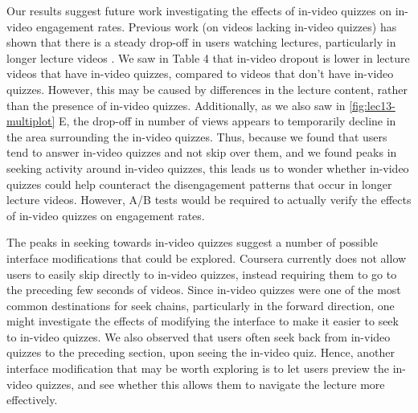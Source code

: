 \documentclass{sigchi}
\begin{document}
Our results suggest future work investigating the effects of in-video quizzes on in-video engagement rates. Previous work (on videos lacking in-video quizzes) has shown that there is a steady drop-off in users watching lectures, particularly in longer lecture videos \cite{juho}. We saw in Table 4 that in-video dropout is lower in lecture videos that have in-video quizzes, compared to videos that don't have in-video quizzes. However, this may be caused by differences in the lecture content, rather than the presence of in-video quizzes. Additionally, as we also saw in \autoref{fig:lec13-multiplot} E, the drop-off in number of views appears to temporarily decline in the area surrounding the in-video quizzes. Thus, because we found that users tend to answer in-video quizzes and not skip over them, and we found peaks in seeking activity around in-video quizzes, this leads us to wonder whether in-video quizzes could help counteract the disengagement patterns that occur in longer lecture videos. However, A/B tests would be required to actually verify the effects of in-video quizzes on engagement rates.



The peaks in seeking towards in-video quizzes suggest a number of possible interface modifications that could be explored. Coursera currently does not allow users to easily skip directly to in-video quizzes, instead requiring them to go to the preceding few seconds of videos. Since in-video quizzes were one of the most common destinations for seek chains, particularly in the forward direction, one might investigate the effects of modifying the interface to make it easier to seek to in-video quizzes. We also observed that users often seek back from in-video quizzes to the preceding section, upon seeing the in-video quiz. Hence, another interface modification that may be worth exploring is to let users preview the in-video quizzes, and see whether this allows them to navigate the lecture more effectively. %
\end{document}
